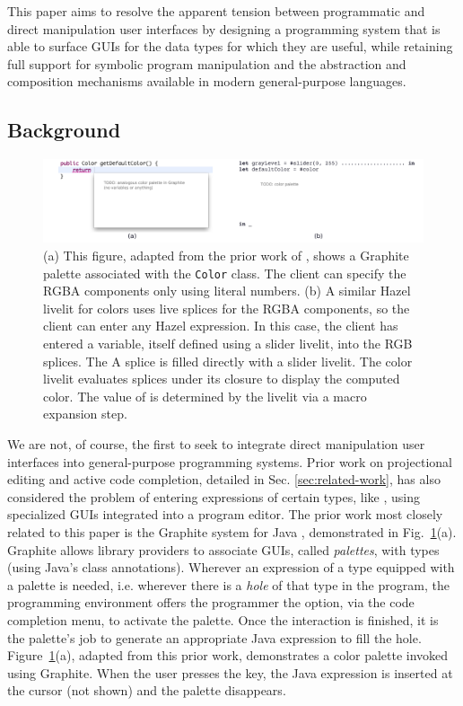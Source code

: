 This paper aims to resolve the apparent tension between 
programmatic and direct manipulation user interfaces by designing a programming system that 
is able to surface GUIs for the data types for which 
they are useful, while retaining full support for symbolic program manipulation  
and the abstraction and composition mechanisms
available in modern general-purpose languages.

\subsection{Background}
\begin{figure}
  \begin{center}
  \includegraphics[width=35pc]{color-palettes.png}\end{center}
  \caption{
  (a) This figure, adapted from the prior work of \citet{Graphite}, 
  shows a Graphite palette associated with the \texttt{Color} class. 
  The client can specify the RGBA components only using literal numbers. 
  (b) A similar Hazel livelit for colors uses live splices for the RGBA components,
  so the client can enter any Hazel expression. 
  In this case, the client has entered a variable, itself defined using a slider livelit, into the RGB 
  splices. The A splice is filled directly with a slider livelit. 
  The color livelit evaluates splices under its closure to display the 
  computed color. 
  The value of  is determined by the livelit via a macro expansion step.}
  \label{fig:color}
\end{figure}

We are not, of course, the first to seek to integrate direct manipulation user interfaces
into general-purpose programming systems.
Prior work on projectional editing
and active code completion, detailed in Sec. \ref{sec:related-work}, 
has also considered the problem of entering expressions 
of certain types, like , 
using specialized GUIs integrated into a program editor. 
The prior work most closely related to this paper is the {Graphite} system for Java \cite{Graphite},
demonstrated in Fig.~\ref{fig:color}(a).
Graphite allows library providers to associate GUIs, called \emph{palettes}, with types (using Java's class annotations). 
Wherever an expression of a type equipped with a palette is needed, 
i.e. wherever there is a \emph{hole} of that type in the program, 
the programming environment offers the programmer the option, via the code completion menu, 
to activate the palette. 
Once the interaction is finished, it is the palette's job to generate an 
appropriate Java expression to fill the hole. 
Figure~\ref{fig:color}(a), adapted from this prior work, demonstrates a color palette invoked using Graphite.
When the user presses the  key, the Java expression  is inserted at the cursor (not shown) and the palette disappears.

